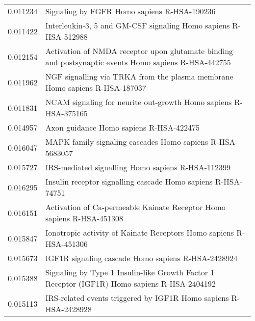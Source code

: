 \begin{longtable}{p{2.4cm}p{14.5cm}}
                 0.011234 &                                                                        Signaling by FGFR Homo sapiens R-HSA-190236 \\
                 0.011422 &                                                    Interleukin-3, 5 and GM-CSF signaling Homo sapiens R-HSA-512988 \\
                 0.012154 &               Activation of NMDA receptor upon glutamate binding and postsynaptic events Homo sapiens R-HSA-442755 \\
                 0.011962 &                                         NGF signalling via TRKA from the plasma membrane Homo sapiens R-HSA-187037 \\
                 0.011831 &                                                    NCAM signaling for neurite out-growth Homo sapiens R-HSA-375165 \\
                 0.014957 &                                                                            Axon guidance Homo sapiens R-HSA-422475 \\
                 0.016047 &                                                          MAPK family signaling cascades Homo sapiens R-HSA-5683057 \\
                 0.015727 &                                                                  IRS-mediated signalling Homo sapiens R-HSA-112399 \\
                 0.016295 &                                                       Insulin receptor signalling cascade Homo sapiens R-HSA-74751 \\
                 0.016151 &                                              Activation of Ca-permeable Kainate Receptor Homo sapiens R-HSA-451308 \\
                 0.015847 &                                                 Ionotropic activity of Kainate Receptors Homo sapiens R-HSA-451306 \\
                 0.015673 &                                                                 IGF1R signaling cascade Homo sapiens R-HSA-2428924 \\
                 0.015388 &                       Signaling by Type 1 Insulin-like Growth Factor 1 Receptor (IGF1R) Homo sapiens R-HSA-2404192 \\
                 0.015113 &                                                   IRS-related events triggered by IGF1R Homo sapiens R-HSA-2428928 \\

\end{longtable}
